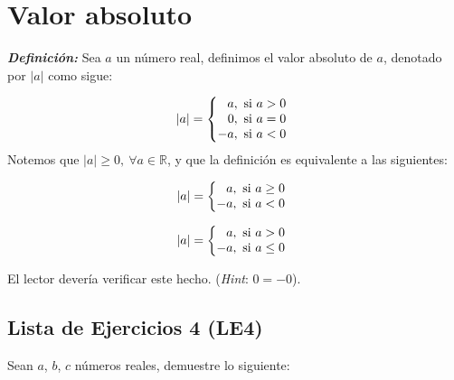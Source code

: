 \documentclass[11pt]{article}
\newcommand{\R}{\mathbb{R}}
\newcommand{\bfit}[1]{\textbf{\textit{#1}}}
\begin{document}
\section*{Valor absoluto}

\bfit{Definición:}  Sea $a$ un número real, definimos el valor absoluto de $a$, denotado por $|a|$ como sigue:

    \[
        |a| = \left\{
    \begin{array}{@{}r@{\thinspace}l}
        a, &  \ \text{si}  \ a>0\\
        0, &  \ \text{si}  \ a=0\\
        -a, & \  \text{si} \  a<0
    \end{array} \right. \]
Notemos que $|a|\geq 0, \ \forall a\in \R$, y que la definición es equivalente a las siguientes:

\begin{center}
\begin{minipage}[c]{.3\linewidth}
    \[|a| = \left\{
        \begin{array}{@{}r@{\thinspace}l}
            a, & \ \text{si} \ a\geq 0\\
            -a, & \ \text{si} \ a<0
        \end{array} \right.\]
    \end{minipage}%
\begin{minipage}[c]{.3\linewidth}
    \[|a| = \left\{
        \begin{array}{@{}r@{\thinspace}l}
            a, & \ \text{si} \ a>0\\
            -a, & \ \text{si} \ a\leq 0
        \end{array} \right.\]
\end{minipage}
\end{center}

El lector devería verificar este hecho. (\textit{Hint}: $0=-0$).

\subsection*{Lista de Ejercicios 4 (LE4)}

Sean $a$, $b$, $c$ números reales, demuestre lo siguiente:
\end{document}
